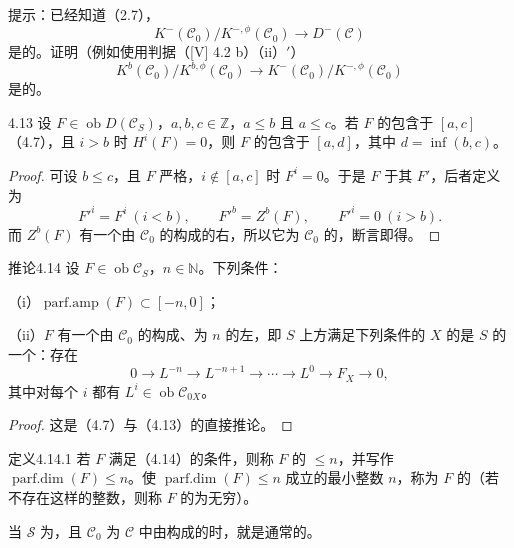 提示：已经知道（2.7），
\[K^-(\mathcal C_0)/K^{-,\phi}(\mathcal C_0)\longrightarrow D^-(\mathcal C)\]
是的。证明（例如使用判据（[V] 4.2 b）（ii）$'$）
\[K^b(\mathcal C_0)/K^{b,\phi}(\mathcal C_0)\longrightarrow K^-(\mathcal C_0)/K^{-,\phi}(\mathcal C_0)\]
是的。

\begin{SGAresult}{}{4.13}
设 $F\in\operatorname{ob}D(\mathcal C_S)$，$a,b,c\in\mathbb Z$，$a\leq b$ 且 $a\leq c$。若 $F$ 的包含于 $[a,c]$（4.7），且 $i>b$ 时 $H^i(F)=0$，则 $F$ 的包含于 $[a,d]$，其中 $d=\inf(b,c)$。
\end{SGAresult}
\begin{proof}
可设 $b\leq c$，且 $F$ 严格，$i\notin[a,c]$ 时 $F^i=0$。于是 $F$ 于其 $F'$，后者定义为
\[F'^i=F^i\ (i<b),\qquad F'^b=Z^b(F),\qquad F'^i=0\ (i>b).\]
而 $Z^b(F)$ 有一个由 $\mathcal C_0$ 的构成的右，所以它为 $\mathcal C_0$ 的，断言即得。
\end{proof}

\begin{SGAresult}{推论}{4.14}
设 $F\in\operatorname{ob}\mathcal C_S$，$n\in\mathbb N$。下列条件：

（i）$\operatorname{parf.amp}(F)\subset[-n,0]$；

（ii）$F$ 有一个由 $\mathcal C_0$ 的构成、为 $n$ 的左，即 $S$ 上方满足下列条件的 $X$ 的是 $S$ 的一个：存在
\[0\longrightarrow L^{-n}\longrightarrow L^{-n+1}\longrightarrow\cdots\longrightarrow L^0\longrightarrow F_X\longrightarrow0,\]
其中对每个 $i$ 都有 $L^i\in\operatorname{ob}\mathcal C_{0X}$。
\end{SGAresult}
\begin{proof}这是（4.7）与（4.13）的直接推论。\end{proof}

\begin{SGAresult}{定义}{4.14.1}
若 $F$ 满足（4.14）的条件，则称 $F$ 的 $\leq n$，并写作 $\operatorname{parf.dim}(F)\leq n$。使 $\operatorname{parf.dim}(F)\leq n$ 成立的最小整数 $n$，称为 $F$ 的（若不存在这样的整数，则称 $F$ 的为无穷）。
\end{SGAresult}
当 $\mathscr S$ 为，且 $\mathcal C_0$ 为 $\mathcal C$ 中由构成的时，就是通常的。

